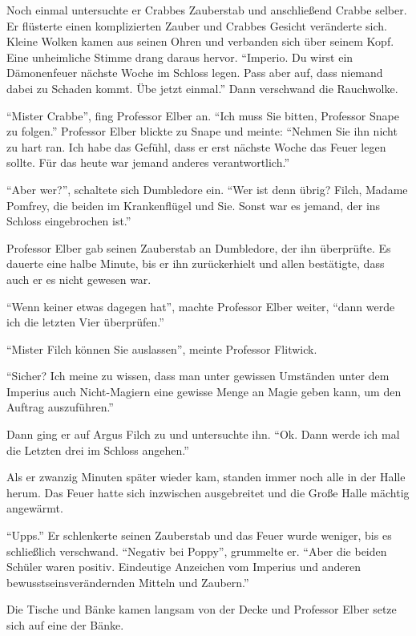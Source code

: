 Noch einmal untersuchte er Crabbes Zauberstab und anschließend Crabbe selber. Er flüsterte einen komplizierten Zauber und Crabbes Gesicht veränderte sich. Kleine Wolken kamen aus seinen Ohren und verbanden sich über seinem Kopf. Eine unheimliche Stimme drang daraus hervor. \enquote{Imperio. Du wirst ein Dämonenfeuer nächste Woche im Schloss legen. Pass aber auf, dass niemand dabei zu Schaden kommt. Übe jetzt einmal.} Dann verschwand die Rauchwolke.

\enquote{Mister Crabbe}, fing Professor Elber an. \enquote{Ich muss Sie bitten, Professor Snape zu folgen.} Professor Elber blickte zu Snape und meinte: \enquote{Nehmen Sie ihn nicht zu hart ran. Ich habe das Gefühl, dass er erst nächste Woche das Feuer legen sollte. Für das heute war jemand anderes verantwortlich.}

\enquote{Aber wer?}, schaltete sich Dumbledore ein. \enquote{Wer ist denn übrig? Filch, Madame Pomfrey, die beiden im Krankenflügel und Sie. Sonst war es jemand, der ins Schloss eingebrochen ist.}

Professor Elber gab seinen Zauberstab an Dumbledore, der ihn überprüfte. Es dauerte eine halbe Minute, bis er ihn zurückerhielt und allen bestätigte, dass auch er es nicht gewesen war.

\enquote{Wenn keiner etwas dagegen hat}, machte Professor Elber weiter, \enquote{dann werde ich die letzten Vier überprüfen.}

\enquote{Mister Filch können Sie auslassen}, meinte Professor Flitwick.

\enquote{Sicher? Ich meine zu wissen, dass man unter gewissen Umständen unter dem Imperius auch \gst Nicht-Magiern \gst eine gewisse Menge an Magie geben kann, um den Auftrag auszuführen.}

Dann ging er auf Argus Filch zu und untersuchte ihn. \enquote{Ok. Dann werde ich mal die Letzten drei im Schloss angehen.}

Als er zwanzig Minuten später wieder kam, standen immer noch alle in der Halle herum. Das Feuer hatte sich inzwischen ausgebreitet und die Große Halle mächtig angewärmt.

\enquote{Upps.} Er schlenkerte seinen Zauberstab und das Feuer wurde weniger, bis es schließlich verschwand. \enquote{Negativ bei Poppy}, grummelte er. \enquote{Aber die beiden Schüler waren positiv. Eindeutige Anzeichen vom Imperius und anderen bewusstseinsverändernden Mitteln und Zaubern.}

Die Tische und Bänke kamen langsam von der Decke und Professor Elber setze sich auf eine der Bänke.

